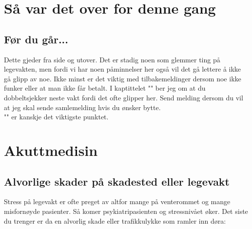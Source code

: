 \documentclass[12pt,a4paper]{memoir}
\begin{document}
\chapter{Så var det over for denne gang}\label{chap:desc_lv_slutt}	 
	\section{Før du går...}
	Dette gjeder fra side \pageref{sec:elv_regns} og utover. Det er stadig noen som glemmer ting på legevakten, men fordi vi har noen påminnelser her også vil det gå lettere å ikke gå glipp av noe. Ikke minst er det viktig med tilbakemeldinger dersom noe ikke funker eller at man ikke får betalt. I kaptittelet "" ber jeg om at du dobbeltsjekker neste vakt fordi det ofte glipper her. Send melding dersom du vil at jeg skal sende samlemelding hvis du ønsker bytte.\\

	"" er kanskje det viktigste punktet. 

\chapter{Akuttmedisin}\label{chap:desc_chk_akuttmed}	
	\section{Alvorlige skader på skadested eller legevakt}\label{sec:desc_chk_traume}
	
	Stress på legevakt er ofte preget av altfor mange på venterommet og mange misfornøyde pasienter. Så komer psykiatripasienten og stressnivået øker. Det siste du trenger er da en alvorlig skade eller trafikkulykke som ramler inn døra:
\end{document}
